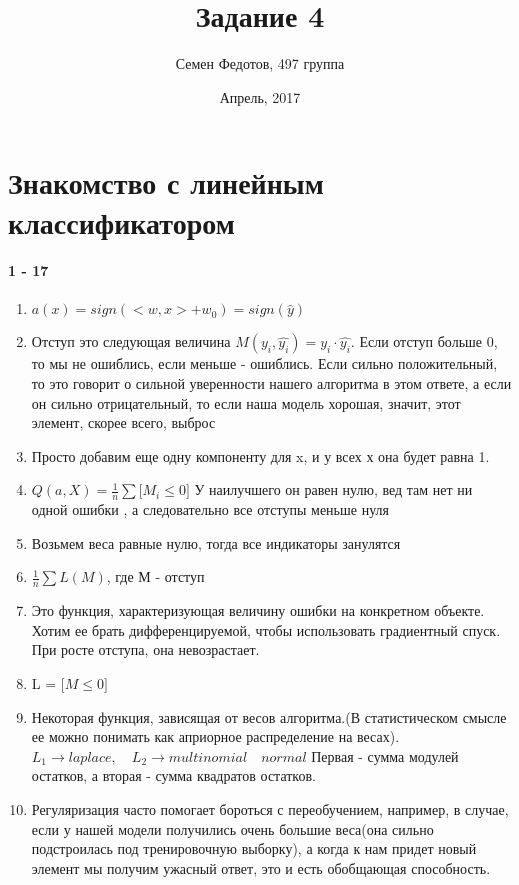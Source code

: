 \documentclass{article}
\title{Задание 4}
\author{Семен Федотов, 497 группа}
\date{Апрель, 2017}
\theoremstyle{plain}
\theoremstyle{definition}
\begin{document}
	\maketitle

\section{Знакомство с линейным классификатором}

\paragraph{1 - 17}

\begin{enumerate}
	\item $a(x) = sign(<w, x> + w_0) = sign(\hat{y})$
	\item Отступ это следующая величина $M(y_i, \hat{y_i}) = y_i \cdot \hat{y_i}$. Если отступ больше 0, то мы не ошиблись, если меньше - ошиблись.  Если сильно положительный, то это говорит о сильной уверенности нашего алгоритма в этом ответе, а если он сильно отрицательный, то если наша модель хорошая, значит, этот элемент, скорее всего, выброс
	\item Просто добавим еще одну компоненту для x, и у всех х она будет равна 1.
	\item $Q(a, X) = \frac{1}{n} \sum \lbrack M_i \leq 0  \rbrack$ У наилучшего он равен нулю, вед там нет ни одной ошибки , а следовательно все отступы меньше нуля
	\item Возьмем веса равные нулю, тогда все индикаторы занулятся
	\item $\frac{1}{n} \sum L(M)$, где М - отступ
	\item Это функция, характеризующая величину ошибки на конкретном объекте. Хотим ее брать дифференцируемой, чтобы использовать градиентный спуск. При росте отступа, она невозрастает.
	\item L = $\lbrack M \leq 0  \rbrack$
	\item Некоторая функция, зависящая от весов алгоритма.(В статистическом смысле ее можно понимать как априорное распределение на весах). $L_1 \rightarrow laplace, \quad L_2 \rightarrow multinomial \quad normal$ Первая - сумма модулей остатков, а вторая - сумма квадратов остатков.
	\item Регуляризация часто помогает бороться с переобучением, например, в случае, если у нашей модели получились очень большие веса(она сильно подстроилась под тренировочную выборку), а когда к нам придет новый элемент мы получим ужасный ответ, это и есть обобщающая способность.

\end{enumerate}
\end{document}
